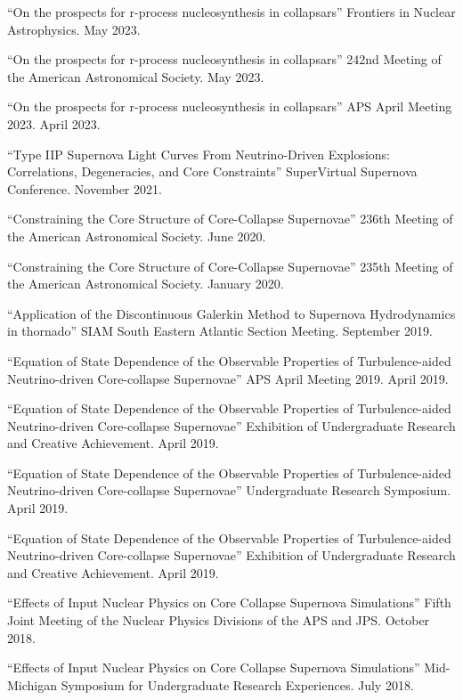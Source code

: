 \documentclass[11pt]{vitae}
\begin{document}
\begin{publist}

  \item ``On the prospects for r-process nucleosynthesis in collapsars'' Frontiers in Nuclear Astrophysics. May 2023.
  \item ``On the prospects for r-process nucleosynthesis in collapsars'' 242nd Meeting of the American Astronomical Society. May 2023.
  \item ``On the prospects for r-process nucleosynthesis in collapsars'' APS April Meeting 2023. April 2023.
  \item ``Type IIP Supernova Light Curves From Neutrino-Driven Explosions: Correlations, Degeneracies, and Core Constraints'' SuperVirtual Supernova Conference. November 2021.
  \item ``Constraining the Core Structure of Core-Collapse Supernovae'' 236th Meeting of the American Astronomical Society. June 2020.
  \item ``Constraining the Core Structure of Core-Collapse Supernovae'' 235th Meeting of the American Astronomical Society. January 2020.
  \item ``Application of the Discontinuous Galerkin Method to Supernova Hydrodynamics in thornado'' SIAM South Eastern Atlantic Section Meeting. September 2019.
  \item ``Equation of State Dependence of the Observable Properties of Turbulence-aided Neutrino-driven Core-collapse Supernovae'' APS April Meeting 2019. April 2019.
  \item ``Equation of State Dependence of the Observable Properties of Turbulence-aided Neutrino-driven Core-collapse Supernovae'' Exhibition of Undergraduate Research and Creative Achievement. April 2019.
  \item ``Equation of State Dependence of the Observable Properties of Turbulence-aided Neutrino-driven Core-collapse Supernovae'' Undergraduate Research Symposium. April 2019.
  \item ``Equation of State Dependence of the Observable Properties of Turbulence-aided Neutrino-driven Core-collapse Supernovae'' Exhibition of Undergraduate Research and Creative Achievement. April 2019.
  \item ``Effects of Input Nuclear Physics on Core Collapse Supernova Simulations'' Fifth Joint Meeting of the Nuclear Physics Divisions of the APS and JPS. October 2018.
  \item ``Effects of Input Nuclear Physics on Core Collapse Supernova Simulations'' Mid-Michigan Symposium for Undergraduate Research Experiences. July 2018.

\end{publist}
\end{document}

